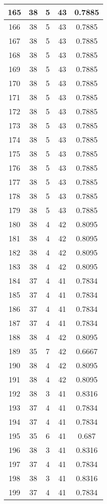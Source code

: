 \documentclass[letterpaper, 12pt]{article}
\begin{document}
\begin{longtable}{|c|c|c|c|c|}
\hline
165 & 38 & 5 & 43 & 0.7885 \\
\hline
166 & 38 & 5 & 43 & 0.7885 \\
\hline
167 & 38 & 5 & 43 & 0.7885 \\
\hline
168 & 38 & 5 & 43 & 0.7885 \\
\hline
169 & 38 & 5 & 43 & 0.7885 \\
\hline
170 & 38 & 5 & 43 & 0.7885 \\
\hline
171 & 38 & 5 & 43 & 0.7885 \\
\hline
172 & 38 & 5 & 43 & 0.7885 \\
\hline
173 & 38 & 5 & 43 & 0.7885 \\
\hline
174 & 38 & 5 & 43 & 0.7885 \\
\hline
175 & 38 & 5 & 43 & 0.7885 \\
\hline
176 & 38 & 5 & 43 & 0.7885 \\
\hline
177 & 38 & 5 & 43 & 0.7885 \\
\hline
178 & 38 & 5 & 43 & 0.7885 \\
\hline
179 & 38 & 5 & 43 & 0.7885 \\
\hline
180 & 38 & 4 & 42 & 0.8095 \\
\hline
181 & 38 & 4 & 42 & 0.8095 \\
\hline
182 & 38 & 4 & 42 & 0.8095 \\
\hline
183 & 38 & 4 & 42 & 0.8095 \\
\hline
184 & 37 & 4 & 41 & 0.7834 \\
\hline
185 & 37 & 4 & 41 & 0.7834 \\
\hline
186 & 37 & 4 & 41 & 0.7834 \\
\hline
187 & 37 & 4 & 41 & 0.7834 \\
\hline
188 & 38 & 4 & 42 & 0.8095 \\
\hline
189 & 35 & 7 & 42 & 0.6667 \\
\hline
190 & 38 & 4 & 42 & 0.8095 \\
\hline
191 & 38 & 4 & 42 & 0.8095 \\
\hline
192 & 38 & 3 & 41 & 0.8316 \\
\hline
193 & 37 & 4 & 41 & 0.7834 \\
\hline
194 & 37 & 4 & 41 & 0.7834 \\
\hline
195 & 35 & 6 & 41 & 0.687 \\
\hline
196 & 38 & 3 & 41 & 0.8316 \\
\hline
197 & 37 & 4 & 41 & 0.7834 \\
\hline
198 & 38 & 3 & 41 & 0.8316 \\
\hline
199 & 37 & 4 & 41 & 0.7834 \\
\hline
\end{longtable}
\end{document}
